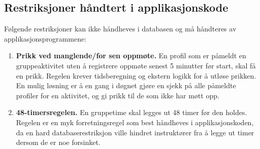 \subsection{Restriksjoner håndtert i applikasjonskode}

Følgende restriksjoner kan ikke håndheves i databasen og må håndteres av
applikasjonsprogrammene:

\begin{enumerate}
    \item \textbf{Prikk ved manglende/for sen oppmøte.}
    En profil som er påmeldt en gruppeaktivitet uten å registrere oppmøte
    senest 5 minutter før start, skal få en prikk.
    Regelen krever tidsberegning og ekstern logikk for å utløse prikken.
    En mulig løsning er å en gang i døgnet gjøre en sjekk på alle påmeldte profiler for en aktivitet, og gi prikk til de som ikke har møtt opp.

    \item \textbf{48-timersregelen.}
    En gruppetime skal legges ut 48 timer før den holdes.
    Regelen er en myk forretningsregel som best håndheves i applikasjonskoden,
    da en hard databaserestriksjon ville hindret instruktører fra å legge ut
    timer dersom de er noe forsinket.
\end{enumerate}
